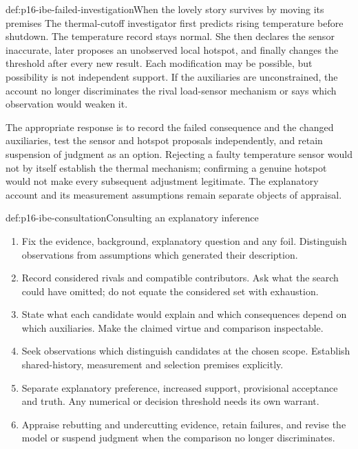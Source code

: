 \begin{hbexample}{def:p16-ibe-failed-investigation}{When the lovely story survives by moving its premises}
The thermal-cutoff investigator first predicts rising temperature before
shutdown. The temperature record stays normal. She then declares the
sensor inaccurate, later proposes an unobserved local hotspot, and finally
changes the threshold after every new result. Each modification may be
possible, but possibility is not independent support. If the auxiliaries
are unconstrained, the account no longer discriminates the rival load-sensor
mechanism or says which observation would weaken it.

The appropriate response is to record the failed consequence and the
changed auxiliaries, test the sensor and hotspot proposals independently,
and retain suspension of judgment as an option. Rejecting a faulty
temperature sensor would not by itself establish the thermal mechanism;
confirming a genuine hotspot would not make every subsequent adjustment
legitimate. The explanatory account and its measurement assumptions remain
separate objects of appraisal.
\end{hbexample}

\begin{hbmethod}{def:p16-ibe-consultation}{Consulting an explanatory inference}
\begin{enumerate}
\item Fix the evidence, background, explanatory question and any foil.
      Distinguish observations from assumptions which generated their description.
\item Record considered rivals and compatible contributors. Ask what the
      search could have omitted; do not equate the considered set with exhaustion.
\item State what each candidate would explain and which consequences depend
      on which auxiliaries. Make the claimed virtue and comparison inspectable.
\item Seek observations which distinguish candidates at the chosen scope.
      Establish shared-history, measurement and selection premises explicitly.
\item Separate explanatory preference, increased support, provisional
      acceptance and truth. Any numerical or decision threshold needs its own warrant.
\item Appraise rebutting and undercutting evidence, retain failures, and revise
      the model or suspend judgment when the comparison no longer discriminates.
\end{enumerate}
\end{hbmethod}

